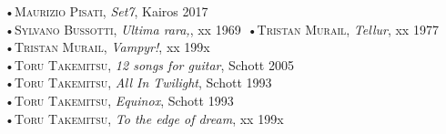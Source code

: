 \documentclass[oneside]{article}
\begin{document}
\begin{multicols*}{2}
•\textsc{\textsf {Maurizio Pisati}}, \emph{Set7}, Kairos 2017\\
•\textsc{\textsf {Sylvano Bussotti}}, \emph{Ultima rara,}, xx 1969\
•\textsc{\textsf {Tristan Murail}}, \emph{Tellur}, xx 1977\\
•\textsc{\textsf {Tristan Murail}}, \emph{Vampyr!}, xx 199x\\
•\textsc{\textsf {Toru Takemitsu}}, \emph{12 songs for guitar}, Schott 2005\\
•\textsc{\textsf {Toru Takemitsu}}, \emph{All In Twilight}, Schott 1993\\
•\textsc{\textsf {Toru Takemitsu}}, \emph{Equinox}, Schott 1993\\
•\textsc{\textsf {Toru Takemitsu}}, \emph{To the edge of dream}, xx 199x\\


\end{multicols*}
\end{document}
